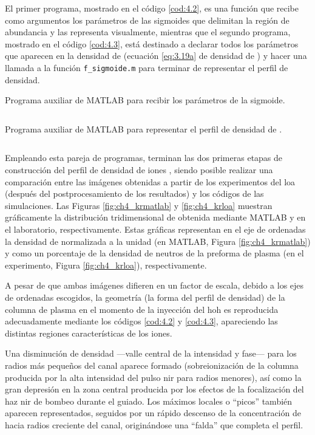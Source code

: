El primer programa, mostrado en el código \ref{cod:4.2}, es una función que recibe como argumentos los parámetros de las sigmoides que delimitan la región de abundancia y las representa visualmente, mientras que el segundo programa, mostrado en el código \ref{cod:4.3}, está destinado a declarar todos los parámetros que aparecen en la densidad de  (ecuación \eqref{eq:3.19a} de densidad de ) y hacer una llamada a la función \texttt{f\_sigmoide.m} para terminar de representar el perfil de densidad.

\begin{listing}[htbp]
  \caption{Programa auxiliar de MATLAB para recibir los parámetros de la sigmoide.}
  \inputminted[firstline=1, lastline=27]{matlab}{Programas/f_sigmoide.m}
  \label{cod:4.2}
\end{listing}

\begin{longlisting}
  \caption{Programa auxiliar de MATLAB para representar el perfil de densidad de .}
  \inputminted[firstline=1, lastline=66]{matlab}{Programas/d_kripton.m}
  \label{cod:4.3}
\end{longlisting}

Empleando esta pareja de programas, terminan las dos primeras etapas de construcción del perfil de densidad de iones , siendo posible realizar una comparación entre las imágenes obtenidas a partir de los experimentos del \acrshort{loa} (después del postprocesamiento de los resultados) y los códigos de las simulaciones. Las Figuras \ref{fig:ch4_krmatlab} y \ref{fig:ch4_krloa} muestran gráficamente la distribución tridimensional de  obtenida mediante MATLAB y en el laboratorio\autocite{Tuitje2020}, respectivamente. Estas gráficas representan en el eje de ordenadas la densidad de  normalizada a la unidad (en MATLAB, Figura \ref{fig:ch4_krmatlab}) y como un porcentaje de la densidad de neutros de la preforma de plasma (en el experimento, Figura \ref{fig:ch4_krloa}), respectivamente. 

A pesar de que ambas imágenes difieren en un factor de escala, debido a los ejes de ordenadas escogidos, la geometría (la forma del perfil de densidad) de la columna de plasma en el momento de la inyección del \acrshort{hoh} es reproducida adecuadamente mediante los códigos \ref{cod:4.2} y \ref{cod:4.3}, apareciendo las distintas regiones características de los iones. 

Una disminución de densidad ---valle central de la intensidad y fase--- para los radios más pequeños del canal aparece formado (sobreionización de la columna producida por la alta intensidad del pulso \acrshort{nir} para radios menores), así como la gran depresión en la zona central producida por los efectos de la focalización del haz \acrshort{nir} de bombeo durante el guiado. Los máximos locales o \enquote{picos} también aparecen representados, seguidos por un rápido descenso de la concentración de  hacia radios creciente del canal, originándose una \enquote{falda} que completa el perfil.

